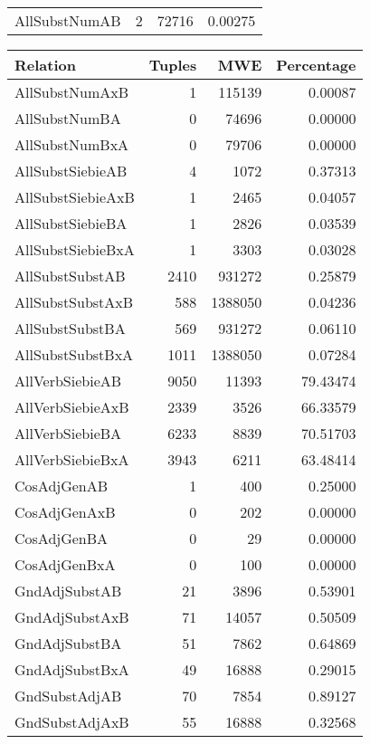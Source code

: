 \begin{table}[t]
\begin{tabular}{|l|r|r|r|}
        AllSubstNumAB & 2 & 72716 & 0.00275 \\
        \end{tabular}
        \quad
        \begin{tabular}{|l|r|r| r|}
        \hline 
        \textbf{Relation} & \textbf{Tuples} & \textbf{MWE} & \textbf{Percentage} \\
        \hline
        AllSubstNumAxB & 1 & 115139 & 0.00087 \\
        AllSubstNumBA & 0 & 74696 & 0.00000 \\
        AllSubstNumBxA & 0 & 79706 & 0.00000 \\
        AllSubstSiebieAB & 4 & 1072 & 0.37313 \\
        AllSubstSiebieAxB & 1 & 2465 & 0.04057 \\
        AllSubstSiebieBA & 1 & 2826 & 0.03539 \\
        AllSubstSiebieBxA & 1 & 3303 & 0.03028 \\
        AllSubstSubstAB & 2410 & 931272 & 0.25879 \\
        AllSubstSubstAxB & 588 & 1388050 & 0.04236 \\
        AllSubstSubstBA & 569 & 931272 & 0.06110 \\
        AllSubstSubstBxA & 1011 & 1388050 & 0.07284 \\
        AllVerbSiebieAB & 9050 & 11393 & 79.43474 \\
        AllVerbSiebieAxB & 2339 & 3526 & 66.33579 \\
        AllVerbSiebieBA & 6233 & 8839 & 70.51703 \\
        AllVerbSiebieBxA & 3943 & 6211 & 63.48414 \\
        CosAdjGenAB & 1 & 400 & 0.25000 \\
        CosAdjGenAxB & 0 & 202 & 0.00000 \\
        CosAdjGenBA & 0 & 29 & 0.00000 \\
        CosAdjGenBxA & 0 & 100 & 0.00000 \\
        GndAdjSubstAB & 21 & 3896 & 0.53901 \\
        GndAdjSubstAxB & 71 & 14057 & 0.50509 \\
        GndAdjSubstBA & 51 & 7862 & 0.64869 \\
        GndAdjSubstBxA & 49 & 16888 & 0.29015 \\
        GndSubstAdjAB & 70 & 7854 & 0.89127 \\
        GndSubstAdjAxB & 55 & 16888 & 0.32568 \\

\end{tabular}
\end{table}
